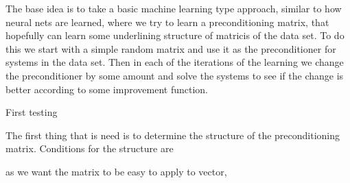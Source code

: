 The base idea is to take a basic machine learning type approach, similar to how neural nets are learned, where we try to learn a preconditioning matrix, that hopefully can learn some underlining structure of matricis of the data set. To do this we start with a simple random matrix and use it as the preconditioner for systems in the data set. Then in each of the iterations of the learning we change the preconditioner by some amount and solve the systems to see if the change is better according to some improvement function.


First testing

The first thing that is need is to determine the structure of the preconditioning matrix. Conditions for the structure are 


as we want the matrix to be easy to apply to vector, 